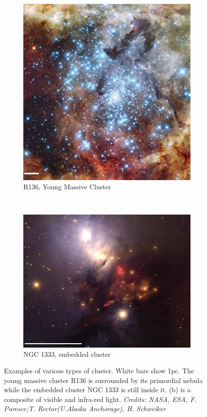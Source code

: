 \begin{figure}
	 \begin{subfigure}[b]{0.415\textwidth}
        \includegraphics[width=\textwidth]{Figures/0_R136_scale.jpg}
        \caption{R136, Young Massive Cluster}
        \label{Fig:0_openglobular2.ymc}
    \end{subfigure}
    ~ 
    \begin{subfigure}[b]{0.55\textwidth}
        \includegraphics[width=\textwidth]{Figures/0_NGC1333_scale_contrast.jpg}
        \caption{NGC 1333, embedded cluster}
        \label{Fig:0_openglobular2.emb}
    \end{subfigure}
        \caption{Examples of various types of cluster. White bars show 1pc. The young massive cluster R136 is  surrounded by its primordial nebula while the embedded cluster NGC 1333 is still inside it. (b) is a composite of visible and infra-red light. \textit{Credits: NASA, ESA, F. Paresce;T. Rector(U.Alaska Anchorage), H. Schweiker}}
    \label{Fig:0_ymcemb}
\end{figure}


